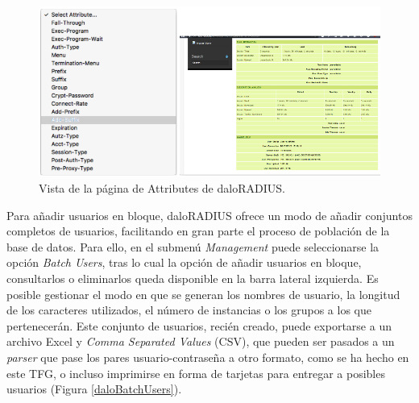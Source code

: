 \begin{figure}[!t]
\begin{center}
\includegraphics[width=0.75\linewidth]{./5_AnalisisOrganico/Img/daloAttributes.png}
\end{center}
\caption{Vista de la página de Attributes de daloRADIUS.}
\label{daloAttributes}
\end{figure}

Para añadir usuarios en bloque, daloRADIUS ofrece un modo de añadir conjuntos completos de usuarios, facilitando en gran parte el proceso de población de la base de datos. Para ello, en el submenú \emph{Management} puede seleccionarse la opción \emph{Batch Users}, tras lo cual la opción de añadir usuarios en bloque, consultarlos o eliminarlos queda disponible en la barra lateral izquierda. Es posible gestionar el modo en que se generan los nombres de usuario, la longitud de los caracteres utilizados, el número de instancias o los grupos a los que pertenecerán. Este conjunto de usuarios, recién creado, puede exportarse a un archivo Excel y \emph{Comma Separated Values} (\acrshort{CSV}), que pueden ser pasados a un \emph{parser} que pase los pares usuario-contraseña a otro formato, como se ha hecho en este TFG, o incluso imprimirse en forma de tarjetas para entregar a posibles usuarios (Figura \ref{daloBatchUsers}).


